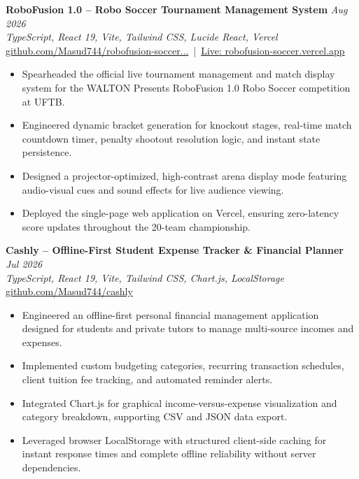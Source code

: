 \documentclass[11pt,a4paper]{article}
\begin{document}

\textbf{RoboFusion 1.0 -- Robo Soccer Tournament Management System} \hfill \textit{Aug 2026} \\
\textit{TypeScript, React 19, Vite, Tailwind CSS, Lucide React, Vercel} \\
\href{https://github.com/Masud744/robofusion-robo-soccer-tournament-system}{github.com/Masud744/robofusion-soccer...} \,|\, \href{https://robofusion-soccer.vercel.app/}{Live: robofusion-soccer.vercel.app}
\begin{itemize}
    \item Spearheaded the official live tournament management and match display system for the WALTON Presents RoboFusion 1.0 Robo Soccer competition at UFTB.
    \item Engineered dynamic bracket generation for knockout stages, real-time match countdown timer, penalty shootout resolution logic, and instant state persistence.
    \item Designed a projector-optimized, high-contrast arena display mode featuring audio-visual cues and sound effects for live audience viewing.
    \item Deployed the single-page web application on Vercel, ensuring zero-latency score updates throughout the 20-team championship.
\end{itemize}

\textbf{Cashly -- Offline-First Student Expense Tracker \& Financial Planner} \hfill \textit{Jul 2026} \\
\textit{TypeScript, React 19, Vite, Tailwind CSS, Chart.js, LocalStorage} \\
\href{https://github.com/Masud744/cashly}{github.com/Masud744/cashly}
\begin{itemize}
    \item Engineered an offline-first personal financial management application designed for students and private tutors to manage multi-source incomes and expenses.
    \item Implemented custom budgeting categories, recurring transaction schedules, client tuition fee tracking, and automated reminder alerts.
    \item Integrated Chart.js for graphical income-versus-expense visualization and category breakdown, supporting CSV and JSON data export.
    \item Leveraged browser LocalStorage with structured client-side caching for instant response times and complete offline reliability without server dependencies.
\end{itemize}
\end{document}
